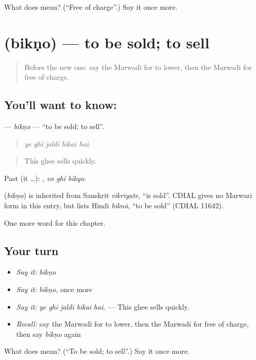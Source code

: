 \begin{tcolorbox}[breakable,colback=teal!4,colframe=teal!35!black,title={Before you move on}]
What does  mean? (\textquotedblleft{}Free of charge\textquotedblright{}.) Say it once more.
\end{tcolorbox}
\section[\texorpdfstring{\mw{बिकणो} (bikṇo)}{बिकणो (bikṇo)}]{ (bikṇo) — to be sold; to sell}

\label{lesson:MW-C213-bikno}



\begin{quote}
Before the new one: say the Marwadi for to lower, then the Marwadi for free of charge.
\end{quote}

\subsection*{You'll want to know: }
\textbf{} — \emph{bikṇo} — \textquotedblleft{}to be sold; to sell\textquotedblright{}.

\begin{quote}
    
\end{quote}

\begin{quote}
\emph{ye ghī jaldī bikai hai.}
\end{quote}

\begin{quote}
This ghee sells quickly.
\end{quote}

Past (it …):   , \emph{vo ghī bikyo}.

\begin{cousinweb}
\textbf{} (\emph{bikṇo}) is inherited from Sanskrit \emph{vikrīyate}, \textquotedblleft{}is sold\textquotedblright{}. CDIAL gives no Marwari form in this entry, but lists Hindi \emph{biknā}, \textquotedblleft{}to be sold\textquotedblright{} (CDIAL 11642).
\end{cousinweb}

\begin{grammarlens}[title={What you've built}]
One more word for this chapter.
\end{grammarlens}

\subsection*{Your turn}
\begin{itemize}
\raggedright
  \item \emph{Say it:} \emph{bikṇo}
  \item \emph{Say it:} \emph{bikṇo}, once more
  \item \emph{Say it:} \emph{ye ghī jaldī bikai hai.} — This ghee sells quickly.
  \item \emph{Recall:} say the Marwadi for to lower, then the Marwadi for free of charge, then say \emph{bikṇo} again
\end{itemize}

\begin{tcolorbox}[breakable,colback=teal!4,colframe=teal!35!black,title={Before you move on}]
What does  mean? (\textquotedblleft{}To be sold; to sell\textquotedblright{}.) Say it once more.
\end{tcolorbox}
